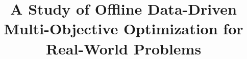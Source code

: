 \documentclass[conference]{IEEEtran}
\begin{document}
\title{A Study of Offline Data-Driven Multi-Objective Optimization for Real-World Problems}

\author{}


\maketitle
\end{document}
